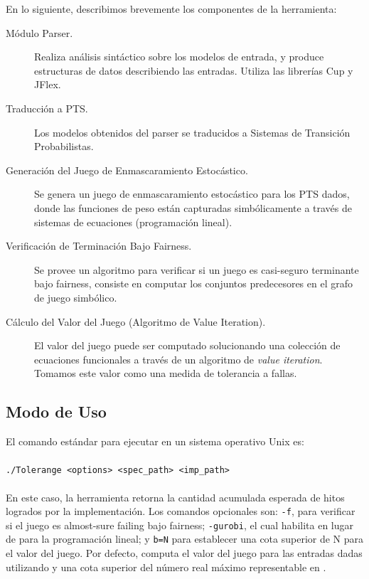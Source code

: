     En lo siguiente, describimos brevemente los componentes de la herramienta:
\begin{description}
    \item[Módulo Parser.] Realiza análisis sintáctico sobre los modelos de entrada, y produce estructuras de datos describiendo las entradas. Utiliza las librerías \textsf{Cup} y \textsf{JFlex}.
    \item[Traducción a PTS.] Los modelos obtenidos del parser se traducidos a Sistemas de Transición Probabilistas. 
    \item[Generación del Juego de Enmascaramiento Estocástico.] Se genera un juego de enmascaramiento estocástico para los PTS dados, donde las funciones de peso están capturadas simbólicamente a través de sistemas de ecuaciones (programación lineal).
    \item[Verificación de Terminación Bajo Fairness.] Se provee un algoritmo para verificar si un juego es casi-seguro terminante bajo fairness, consiste en computar los conjuntos predecesores en el grafo de juego simbólico. 
    \item[Cálculo del Valor del Juego (Algoritmo de Value Iteration).] El valor del juego puede ser computado solucionando una colección de ecuaciones funcionales a través de un algoritmo de \textit{value iteration}.
    Tomamos este valor como una medida de tolerancia a fallas.
\end{description}
\subsection{Modo de Uso}

El comando estándar para ejecutar {\Tolerange} en un sistema operativo Unix es:
\\ 
\\
 \verb"./Tolerange <options> <spec_path> <imp_path>"
\\
\\
    En este caso, la herramienta retorna la cantidad acumulada esperada de hitos logrados por la implementación.
Los comandos opcionales son: \verb"-f", para verificar si el juego es almost-sure failing bajo fairness;  \verb"-gurobi", el cual habilita {\Gurobi} \cite{gurobi} en lugar de {\SSC} \cite{SSC} para la programación lineal; y \verb"b=N" para establecer una cota superior de N para el valor del juego.
    Por defecto,  {\Tolerange} computa el valor del juego para las entradas dadas utilizando {\SSC} y una cota superior del número real máximo representable en {\Java}. 